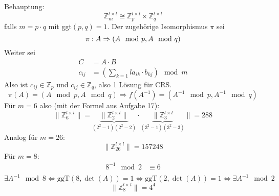 \documentclass[mitschriften.tex]{subfiles}
\begin{document}
\subsection{}
Behauptung:
\begin{equation*}
  \mathbb{Z}_m^{l\times l} \cong  \mathbb{Z}_p^{l\times l} \times  \mathbb{Z}_q^{l\times l}
\end{equation*}
falls $m=p \cdot q$ mit ggt$(p,q) = 1$. Der zugehörige Isomorphismus $\pi$ sei
\begin{equation*}
  \pi:A \Rightarrow (A\mod p, A\mod q)\\
\end{equation*}
Weiter sei
\begin{align*}
  C &= A\cdot B\\
  c_{ij} &= \left(\sum_{k=1}{l}a_{ik}\cdot b_{kj}\right)\mod m 
\end{align*}
Also ist $c_{ij} \in \mathbb{Z}_p$ und $c_{ij} \in \mathbb{Z}_q$, also 1 Lösung für CRS.
\begin{equation*}
  \pi(A) = (A\mod p, A\mod q) \Rightarrow f(A^{-1}) = (A^{-1}\mod p, A^{-1}\mod q)
\end{equation*}
Für $m=6$ also (mit der Formel aus Aufgabe 17):
\begin{equation*}
  \|\mathbb{Z}_6^{l\times l} \| = \underbrace{\|\mathbb{Z}_2^{l\times l}\|}_{(2^2-1)(2^2-2)} \cdot  \underbrace{\|\mathbb{Z}_3^{l\times l}}_{(3^2-1)(3^2-3)}\| = 288
\end{equation*}
Analog für $m=26$:
\begin{equation*}
  \|\mathbb{Z}_{26}^{l\times l} \| = 157248
\end{equation*}
Für $m=8$:
\begin{align*}
  8^{-1} \mod 2 &\equiv 6\\
\end{align*}
\begin{equation*}
\exists A^{-1}\mod 8 \Leftrightarrow \text{ggT}(8, \det(A)) = 1 \Leftrightarrow \text{ggT}(2, \det(A)) = 1 \Leftrightarrow \exists A^{-1}\mod 2
\end{equation*}
\begin{equation*}
  \|\mathbb{Z}_8^{l\times l} \| = 4^4 
\end{equation*}
\subsection{}

\subsection{}
\end{document}
